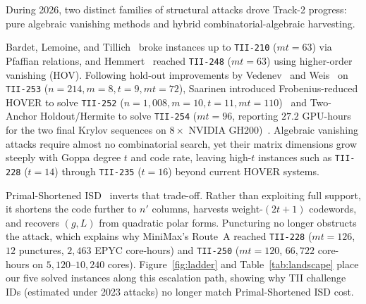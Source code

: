 \documentclass[11pt,a4paper]{article}
\begin{document}
During 2026, two distinct families of structural attacks drove Track-2 progress: pure algebraic vanishing methods and hybrid combinatorial-algebraic harvesting.

Bardet, Lemoine, and Tillich~\cite{BLT26} broke instances up to \texttt{TII-210} ($mt=63$) via Pfaffian relations, and Hemmert~\cite{Hemmert26} reached \texttt{TII-248} ($mt=63$) using higher-order vanishing (HOV). Following hold-out improvements by Vedenev~\cite{Vedenev26} and Weis~\cite{Weis26} on \texttt{TII-253} ($n=214, m=8, t=9, mt=72$), Saarinen introduced Frobenius-reduced HOVER to solve \texttt{TII-252} ($n=1{,}008, m=10, t=11, mt=110$)~\cite{Saarinen26HOVER} and Two-Anchor Holdout/Hermite to solve \texttt{TII-254} ($mt=96$, reporting $27.2$ GPU-hours for the two final Krylov sequences on $8\times$ NVIDIA GH200)~\cite{Saarinen26TwoAnchor}. Algebraic vanishing attacks require almost no combinatorial search, yet their matrix dimensions grow steeply with Goppa degree $t$ and code rate, leaving high-$t$ instances such as \texttt{TII-228} ($t=14$) through \texttt{TII-235} ($t=16$) beyond current HOVER systems.

Primal-Shortened ISD~\cite{MiniMax26} inverts that trade-off. Rather than exploiting full support, it shortens the code further to $n'$ columns, harvests weight-$(2t+1)$ codewords, and recovers $(g, L)$ from quadratic polar forms. Puncturing no longer obstructs the attack, which explains why MiniMax's Route~A reached \texttt{TII-228} ($mt=126$, $12$ punctures, $2{,}463$ EPYC core-hours) and \texttt{TII-250} ($mt=120$, $66{,}722$ core-hours on $5{,}120\text{--}10{,}240$ cores). Figure~\ref{fig:ladder} and Table~\ref{tab:landscape} place our five solved instances along this escalation path, showing why TII challenge IDs (estimated under 2023 attacks) no longer match Primal-Shortened ISD cost.
\end{document}
